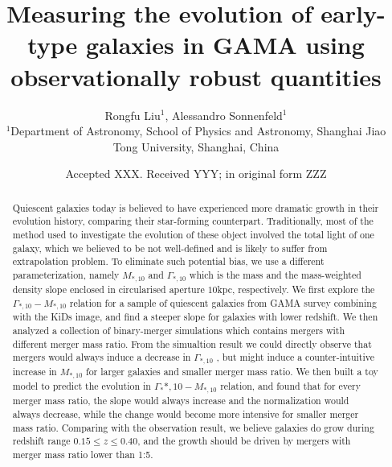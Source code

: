 \documentclass[fleqn,usenatbib]{mnras}
\title[Short title, max. 45 characters]{Measuring the evolution of early-type galaxies in GAMA using observationally robust  quantities}
\author[Rongfu Liu et al.]{
Rongfu Liu$^{1}$, 
Alessandro Sonnenfeld$^{1}$\\
$^{1}$Department of Astronomy, School of Physics and Astronomy, Shanghai Jiao Tong University, Shanghai, China
}
\date{Accepted XXX. Received YYY; in original form ZZZ}
\begin{document}
\label{firstpage}
\pagerange{\pageref{firstpage}--\pageref{lastpage}}
\maketitle

\begin{abstract}
Quiescent galaxies today is believed to have experienced more dramatic growth in their evolution history, comparing their star-forming counterpart. Traditionally, most of the method used to investigate the evolution of these object involved the total light of one galaxy, which we believed to be not well-defined and is likely to suffer from extrapolation problem. To eliminate such potential bias, we use a different parameterization, namely $M_{*,10}$ and $\Gamma_{*,10}$ which is the mass and the mass-weighted density slope enclosed in circularised aperture $10$kpc, respectively. We first explore the $\Gamma_{*,10} - M_{*,10}$ relation for a sample of quiescent galaxies from GAMA survey combining with the KiDs image, and find a steeper slope for galaxies with lower redshift. We then analyzed a collection of binary-merger simulations which contains mergers with different merger mass ratio. From the simualtion result we could directly observe that mergers would always induce a decrease in $\Gamma_{*,10}$ , but might induce a counter-intuitive increase in $M_{*,10}$ for larger galaxies and smaller merger mass ratio. We then built a toy model to predict the evolution in $\Gamma_*{*,10} - M_{*,10}$ relation, and found that for every merger mass ratio, the slope would always increase and the normalization would always decrease, while the change would become more intensive for smaller merger mass ratio. Comparing with the observation result, we believe galaxies do grow during redshift range $0.15 \leq z \leq 0.40$, and the growth should be driven by mergers with merger mass ratio lower than 1:5.
\end{abstract}
\end{document}
